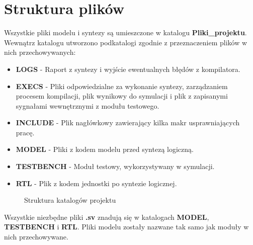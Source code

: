 \documentclass[12pt]{article}
\begin{document}
\section*{Struktura plików}
	Wszystkie pliki modelu i syntezy są umieszczone w katalogu \textbf{Pliki\_projektu}. Wewnątrz katalogu utworzono podkatalogi zgodnie z przeznaczeniem plików w nich przechowywanych:
	
\begin{itemize}
\item \textbf{LOGS} - Raport z syntezy i wyjście ewentualnych błędów z kompilatora. 
\item \textbf{EXECS} - Pliki odpowiedzialne za wykonanie syntezy, zarządzaniem procesem kompilacji, plik wynikowy do symulacji i plik z zapisanymi sygnałami wewnętrznymi z modułu testowego.
\item \textbf{INCLUDE} - Plik nagłówkowy zawierający kilka makr usprawniających pracę.
\item \textbf{MODEL} - Pliki z kodem modelu przed syntezą logiczną.
\item \textbf{TESTBENCH} -  Moduł testowy, wykorzystywany w symulacji.
\item \textbf{RTL} - Plik z kodem jednostki po syntezie logicznej.	
\end{itemize}

\begin{figure}
\caption*{Struktura katalogów projektu}
\label{figure:catalogues}
\end{figure}

Wszystkie niezbędne pliki \textbf{.sv} znadują się w katalogach \textbf{MODEL}, \textbf{TESTBENCH} i \textbf{RTL}. Pliki modelu zostały nazwane tak samo jak moduły w nich przechowywane.
	 
\end{document}
